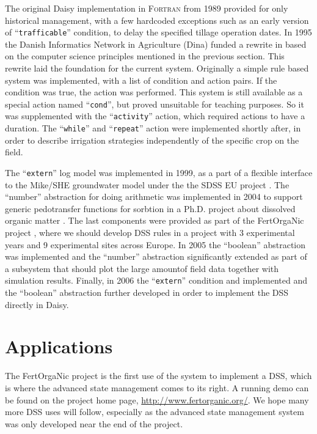 \documentclass[a4paper]{article}
\newcommand{\dname}[1]{``\texttt{#1}''}
\begin{document}
The original Daisy implementation in \textsc{Fortran} from 1989
provided for only historical management, with a few hardcoded
exceptions such as an early version of \dname{trafficable} condition,
to delay the specified tillage operation dates.  In 1995 the Danish
Informatics Network in Agriculture (Dina) funded a rewrite in
\cplusplus{} based on the computer science principles mentioned in the
previous section.  This rewrite laid the foundation for the current
system.  Originally a simple rule based system was implemented, with a
list of condition and action pairs.  If the condition was true, the
action was performed.  This system is still available as a special
action named \dname{cond}, but proved unsuitable for teaching
purposes.  So it was supplemented with the \dname{activity} action,
which required actions to have a duration.  The \dname{while} and
\dname{repeat} action were implemented shortly after, in order to
describe irrigation strategies independently of the specific crop on the
field.

The \dname{extern} log model was implemented in 1999, as a part of a
flexible interface to the Mike/SHE groundwater model \cite{mikeshe}
under the the SDSS EU project \cite{sdss}.  The ``number'' abstraction
for doing arithmetic was implemented in 2004 to support generic
pedotransfer functions for sorbtion in a Ph.D. project about dissolved
organic matter \cite{bgj-dom}.  The last components were provided as
part of the FertOrgaNic project \cite{fertorganic}, where we should
develop DSS rules in a project with 3 experimental years and 9
experimental sites across Europe.  In 2005 the ``boolean'' abstraction
was implemented and the ``number'' abstraction significantly extended
as part of a subsystem that should plot the large amountof field data
together with simulation results.  Finally, in 2006 the \dname{extern}
condition and implemented and the ``boolean'' abstraction further
developed in order to implement the DSS directly in Daisy.

\section{Applications}

The FertOrgaNic project is the first use of the system to implement a
DSS, which is where the advanced state management comes to its right.
A running demo can be found on the project home page,
\url{http://www.fertorganic.org/}.  We hope many more DSS uses will
follow, especially as the advanced state management system was only
developed near the end of the project.
\end{document}
